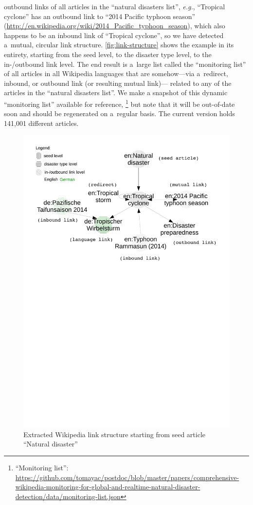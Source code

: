 \documentclass[runningheads,a4paper]{llncs}
\begin{document}
outbound links of all articles in the ``natural disasters list'',
\emph{e.g.}, ``Tropical cyclone'' has an outbound link to
``2014 Pacific typhoon season''
(\url{http://en.wikipedia.org/wiki/2014_Pacific_typhoon_season}),
which also happens to be an inbound link of ``Tropical cyclone'',
so we have detected a~mutual, circular link structure.
\autoref{fig:link-structure} shows the example in its entirety,
starting from the seed level, to the disaster type level, to the in-/outbound link level.
The end result is a~large list called the ``monitoring list''
of all articles in all Wikipedia languages
that are somehow---via a~redirect, inbound, or outbound link (or resulting mutual link)---%
related to any of the articles
in the ``natural disasters list''.
We make a snapshot of this dynamic ``monitoring list'' available for reference,%
\footnote{``Monitoring list'':
\url{https://github.com/tomayac/postdoc/blob/master/papers/comprehensive-wikipedia-monitoring-for-global-and-realtime-natural-disaster-detection/data/monitoring-list.json}}
but note that it will be out-of-date soon and should be regenerated
on a~regular basis.
The current version holds 141,001 different articles.

\begin{figure}[hbt]
  \centering
  \includegraphics[trim=0mm 165mm 0mm 10mm,clip,width=0.875\linewidth]{link-structure}
  \caption{Extracted Wikipedia link structure starting from seed article ``Natural disaster''}
  \label{fig:link-structure}
\end{figure}
\end{document}
